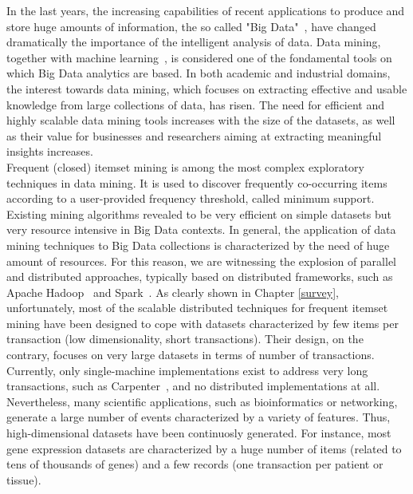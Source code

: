 In the last years, the increasing capabilities of recent applications
to produce and store huge amounts of information,
the so called "Big Data"~\cite{Jin201559}, have changed dramatically
the importance of the intelligent analysis of data.
Data mining, together with machine learning~\cite{DBLP:journals/bdr/Al-JarrahYMKT15}, 
is considered
one of the fondamental tools on which Big Data analytics
are based.
In both academic and industrial domains, the interest towards data mining,
which focuses on extracting effective and usable knowledge from large
collections of data, has risen.
The need for efficient and highly scalable data mining tools increases with the
size of the datasets,
as well as their value for businesses and researchers aiming at extracting
meaningful insights increases.\\
Frequent (closed) itemset mining is among the most complex exploratory
techniques in data mining.
It is used to discover frequently co-occurring items
according to a user-provided frequency threshold, called minimum support.
Existing mining algorithms revealed to be very efficient on simple datasets
but very resource intensive in Big Data contexts.
In general, the application of data mining techniques to Big Data collections
is characterized by the need of huge amount of resources.
For this reason, we are witnessing the explosion of parallel and distributed
approaches,
typically based on distributed frameworks, such as Apache Hadoop~\cite{HDFS}
and Spark~\cite{Zaharia_spark}.
As clearly shown in Chapter \ref{survey}, unfortunately, most of the scalable distributed techniques
for frequent itemset mining have been designed to cope with datasets
characterized by few items per transaction (low dimensionality, short
transactions). Their design, on the contrary, focuses on very large datasets in terms of number of
transactions.
Currently, only single-machine implementations exist to address very long
transactions,
such as Carpenter~\cite{Zaki_Carpenter}, and no distributed implementations at
all.\\
Nevertheless, many scientific applications, such as bioinformatics or networking, 
generate a large number of events characterized by a variety of features.
Thus, high-dimensional datasets have been continuosly generated.
For instance, most gene expression datasets are characterized by
a huge number of items (related to tens of thousands of genes)
and a few records (one transaction per patient or tissue).
